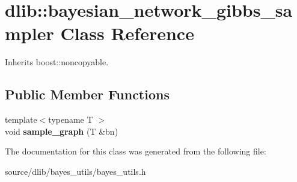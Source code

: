 \hypertarget{classdlib_1_1bayesian__network__gibbs__sampler}{
\section{dlib::bayesian\_\-network\_\-gibbs\_\-sampler Class Reference}
\label{classdlib_1_1bayesian__network__gibbs__sampler}
}


Inherits boost::noncopyable.\subsection*{Public Member Functions}
\begin{DoxyCompactItemize}
\item 
\hypertarget{classdlib_1_1bayesian__network__gibbs__sampler_a6623356f6ceed89ee20455ea27cd723f}{
{\footnotesize template$<$typename T $>$ }\\void {\bfseries sample\_\-graph} (T \&bn)}
\label{classdlib_1_1bayesian__network__gibbs__sampler_a6623356f6ceed89ee20455ea27cd723f}

\end{DoxyCompactItemize}


The documentation for this class was generated from the following file:\begin{DoxyCompactItemize}
\item 
source/dlib/bayes\_\-utils/bayes\_\-utils.h\end{DoxyCompactItemize}
